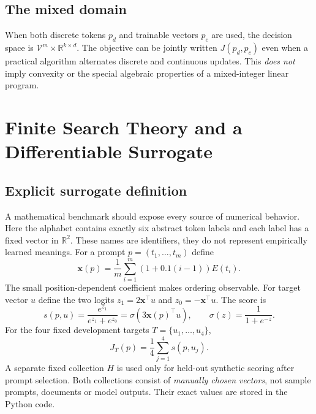 \documentclass[12pt,a4paper,oneside]{report}
\newcommand{\Vocab}{\mathcal V}
\newcommand{\R}{\mathbb R}
\newcommand{\sig}{\sigma}
\begin{document}
\section{The mixed domain}
When both discrete tokens $p_d$ and trainable vectors $p_c$ are used, the decision space is $\Vocab^m\times\R^{k\times d}$. The objective can be jointly written $J(p_d,p_c)$ even when a practical algorithm alternates discrete and continuous updates. This \emph{does not} imply convexity or the special algebraic properties of a mixed-integer linear program.

\chapter{Finite Search Theory and a Differentiable Surrogate}
\section{Explicit surrogate definition}
A mathematical benchmark should expose every source of numerical behavior. Here the alphabet contains exactly six abstract token labels and each label has a fixed vector in $\R^2$. These names are identifiers, they do not represent empirically learned meanings. For a prompt $p=(t_1,\dots,t_m)$ define
\begin{equation}
\mathbf x(p)=\frac{1}{m}\sum_{i=1}^{m}(1+0.1(i-1))E(t_i).
\label{eq:embedding}
\end{equation}
The small position-dependent coefficient makes ordering observable. For target vector $u$ define the two logits $z_1=2\mathbf x^\top u$ and $z_0=-\mathbf x^\top u$. The score is
\begin{equation}
s(p,u)=\frac{e^{z_1}}{e^{z_1}+e^{z_0}}=\sig(3\mathbf x(p)^\top u),\qquad \sig(z)=\frac{1}{1+e^{-z}}.
\label{eq:surrogate}
\end{equation}
For the four fixed development targets $T=\{u_1,\dots,u_4\}$,
\begin{equation}J_T(p)=\frac14\sum_{j=1}^{4}s(p,u_j).\label{eq:train}\end{equation}
A separate fixed collection $H$ is used only for held-out synthetic scoring after prompt selection. Both collections consist of \emph{manually chosen vectors}, not sample prompts, documents or model outputs. Their exact values are stored in the Python code.
\end{document}
